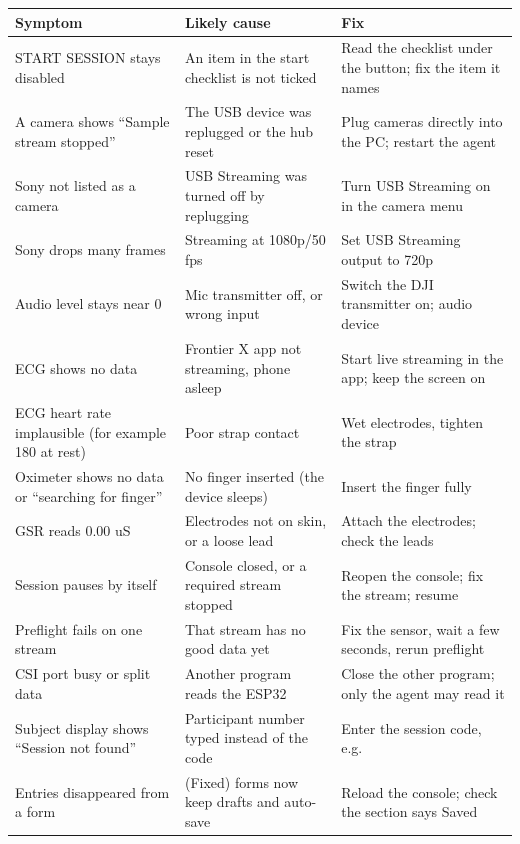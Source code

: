 \documentclass[11pt,a4paper]{article}
\newcommand{\code}[1]{\texttt{\detokenize{#1}}}
\begin{document}
\begin{longtable}{@{}p{4.2cm}p{4.6cm}p{5.8cm}@{}}
\toprule
\textbf{Symptom} & \textbf{Likely cause} & \textbf{Fix} \\
\midrule\endhead
START SESSION stays disabled & An item in the start checklist is not ticked & Read the checklist under the button; fix the item it names \\
A camera shows ``Sample stream stopped'' & The USB device was replugged or the hub reset & Plug cameras directly into the PC; restart the agent \\
Sony not listed as a camera & USB Streaming was turned off by replugging & Turn USB Streaming on in the camera menu \\
Sony drops many frames & Streaming at 1080p/50 fps & Set USB Streaming output to 720p \\
Audio level stays near 0 & Mic transmitter off, or wrong input & Switch the DJI transmitter on; audio device \code{ILCE-6700} \\
ECG shows no data & Frontier X app not streaming, phone asleep & Start live streaming in the app; keep the screen on \\
ECG heart rate implausible (for example 180 at rest) & Poor strap contact & Wet electrodes, tighten the strap \\
Oximeter shows no data or ``searching for finger'' & No finger inserted (the device sleeps) & Insert the finger fully \\
GSR reads 0.00 uS & Electrodes not on skin, or a loose lead & Attach the electrodes; check the leads \\
Session pauses by itself & Console closed, or a required stream stopped & Reopen the console; fix the stream; resume \\
Preflight fails on one stream & That stream has no good data yet & Fix the sensor, wait a few seconds, rerun preflight \\
CSI port busy or split data & Another program reads the ESP32 & Close the other program; only the agent may read it \\
Subject display shows ``Session not found'' & Participant number typed instead of the code & Enter the session code, e.g. \code{9997VFQB} \\
Entries disappeared from a form & (Fixed) forms now keep drafts and auto-save & Reload the console; check the section says Saved \\
\bottomrule
\end{longtable}
\end{document}
